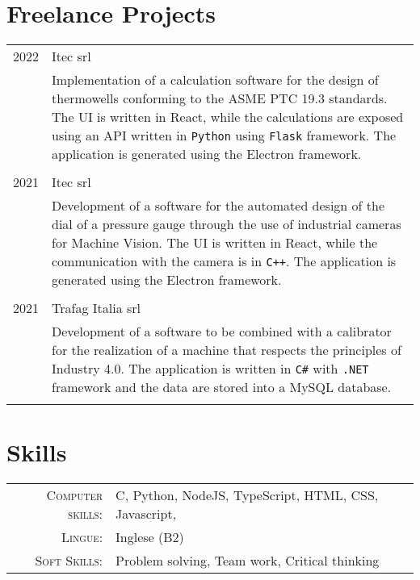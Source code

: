 \documentclass[a4paper, 12pt]{article}
\begin{document}
  \bigskip
  \section{Freelance Projects}
  \begin{tabular}{r|p{14cm}}
    \textsc{2022} & Itec srl \\ & \footnotesize{Implementation of a calculation
    software for the design of thermowells conforming to the ASME PTC 19.3
    standards. The UI is written in React, while the calculations are exposed
    using an API written in \verb!Python! using \verb!Flask! framework. The
    application is generated using the Electron framework.}\\
    \multicolumn{2}{c}{}\\

    \textsc{2021} & Itec srl \\ & \footnotesize{Development of a software for
    the automated design of the dial of a pressure gauge through the use of
    industrial cameras for Machine Vision. The UI is written in React, while the
    communication with the camera is in \verb!C++!. The application is generated
    using the Electron framework.} \\ \multicolumn{2}{c}{}\\

    \textsc{2021} & Trafag Italia srl \\ & \footnotesize{Development of a
    software to be combined with a calibrator for the realization of a machine
    that respects the principles of Industry 4.0. The application is written in
    \verb!C#! with \verb!.NET! framework and the data are stored into a MySQL
    database.} \\ \multicolumn{2}{c}{}\\
  \end{tabular}

  \bigskip
  \section{Skills}
    \begin{tabular}{rl}
      \textsc{Computer skills:}& C, Python, NodeJS, TypeScript, HTML, CSS, Javascript, \\
      \textsc{Lingue:}& Inglese (B2)\normalsize\\
      \textsc{Soft Skills:}& Problem solving, Team work, Critical thinking\\
    \end{tabular}
\end{document}
